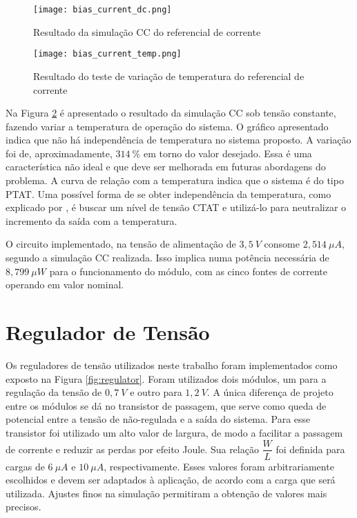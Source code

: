 \begin{figure}[!htb]
	\caption{\label{fig:bias_current_dc}Resultado da simulação {CC} do referencial de corrente}
	\begin{center}
		\texttt{[image: bias\_current\_dc.png]}
	\end{center}
\end{figure}

\begin{figure}[!htb]
	\caption{\label{fig:bias_current_temp}Resultado do teste de variação de temperatura do referencial de corrente}
	\begin{center}
		\texttt{[image: bias\_current\_temp.png]}
	\end{center}
\end{figure}

Na Figura \ref{fig:bias_current_temp} é apresentado o resultado da simulação {CC} sob tensão constante, fazendo variar a temperatura de operação do sistema. O gráfico apresentado indica que não há independência de temperatura no sistema proposto. A variação foi de, aproximadamente, $314~\%$ em torno do valor desejado. Essa é uma característica não ideal e que deve ser melhorada em futuras abordagens do problema. A curva de relação com a temperatura indica que o sistema é do tipo {PTAT}. Uma possível forma de se obter independência da temperatura, como explicado por , é buscar um nível de tensão {CTAT} e utilizá-lo para neutralizar o incremento da saída com a temperatura.

O circuito implementado, na tensão de alimentação de $3,5~V$ consome $2,514~\mu A$, segundo a simulação {CC} realizada. Isso implica numa potência necessária de $8,799~\mu W$ para o funcionamento do módulo, com as cinco fontes de corrente operando em valor nominal.


\section{Regulador de Tensão}
Os reguladores de tensão utilizados neste trabalho foram implementados como exposto na Figura \ref{fig:regulator}. Foram utilizados dois módulos, um para a regulação da tensão de $0,7~V$ e outro para $1,2~V$. A única diferença de projeto entre os módulos se dá no transistor de passagem, que serve como queda de potencial entre a tensão de não-regulada e a saída do sistema. Para esse transistor foi utilizado um alto valor de largura, de modo a facilitar a passagem de corrente e reduzir as perdas por efeito Joule. Sua relação $\dfrac{W}{L}$ foi definida para cargas de $6~\mu A$ e $10~\mu A$, respectivamente. Esses valores foram arbitrariamente escolhidos e devem ser adaptados à aplicação, de acordo com a carga que será utilizada. Ajustes finos na simulação permitiram a obtenção de valores mais precisos.

